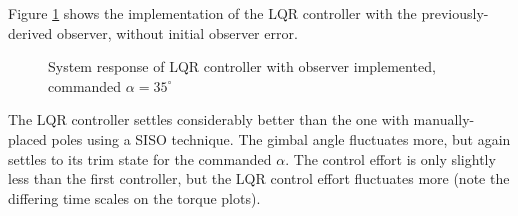 \documentclass[]{aiaa-tc}%
\begin{document}
Figure \ref{fig:ControllerLQRNom} shows the implementation of the LQR controller with the previously-derived observer, without initial observer error.

	\begin{figure}[H]
		\centering
		\caption{System response of LQR controller with observer implemented, commanded $\alpha=35^{\circ}$ }
		\label{fig:ControllerLQRNom}
	\end{figure}	

	The LQR controller settles considerably better than the one with manually-placed poles using a SISO technique. The gimbal angle fluctuates more, but again settles to its trim state for the commanded $\alpha$. The control effort is only slightly less than the first controller, but the LQR control effort fluctuates more (note the differing time scales on the torque plots).
\end{document}
